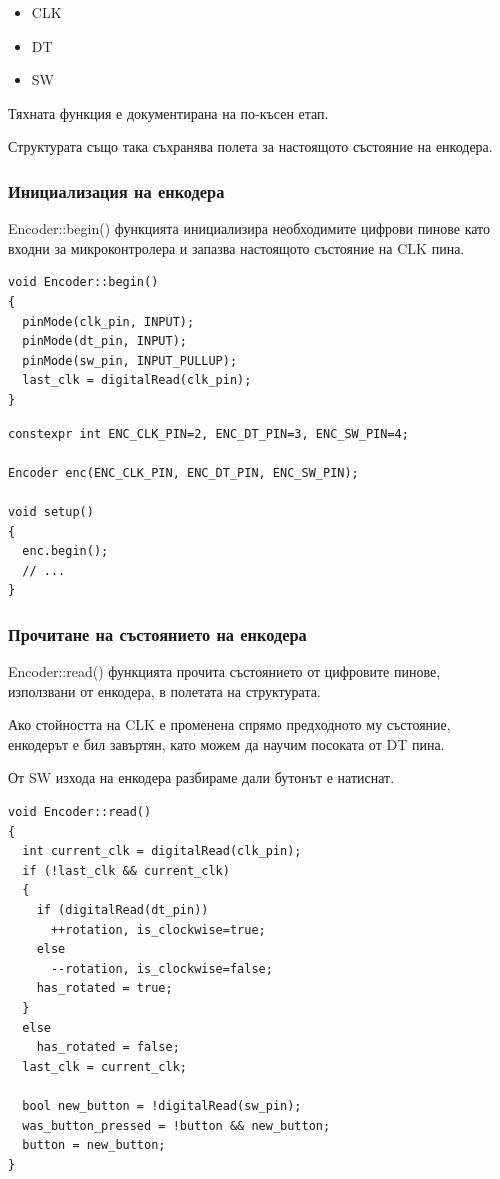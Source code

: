 \documentclass[titlepage, oneside, 14pt]{extbook}
\renewcommand{\texttt}[1]{{\small\ttfamily #1}}
\begin{document}
\begin{itemize}
    \item CLK
    \item DT
    \item SW
\end{itemize}

Тяхната функция е документирана на по-късен етап. %

Структурата също така съхранява полета за настоящото състояние на енкодера.


\subsubsection{Инициализация на енкодера}

\texttt{Encoder::begin()} функцията инициализира необходимите цифрови пинове като
входни за микроконтролера и запазва настоящото състояние на CLK пина.

\begin{verbatim}
void Encoder::begin()
{
  pinMode(clk_pin, INPUT);
  pinMode(dt_pin, INPUT);
  pinMode(sw_pin, INPUT_PULLUP);
  last_clk = digitalRead(clk_pin); 
}
\end{verbatim}

\begin{verbatim}
constexpr int ENC_CLK_PIN=2, ENC_DT_PIN=3, ENC_SW_PIN=4;

Encoder enc(ENC_CLK_PIN, ENC_DT_PIN, ENC_SW_PIN);

void setup()
{
  enc.begin();
  // ...
}
\end{verbatim}

\subsubsection{Прочитане на състоянието на енкодера}

\texttt{Encoder::read()} функцията прочита състоянието от цифровите пинове, използвани от енкодера, в полетата на структурата.

Ако стойността на CLK е променена спрямо предходното му състояние, енкодерът е бил завъртян, като можем да научим
посоката от DT пина.

От SW изхода на енкодера разбираме дали бутонът е натиснат.

\begin{verbatim}
void Encoder::read()
{
  int current_clk = digitalRead(clk_pin);
  if (!last_clk && current_clk)
  {
    if (digitalRead(dt_pin))
      ++rotation, is_clockwise=true;
    else
      --rotation, is_clockwise=false;
    has_rotated = true;
  }
  else
    has_rotated = false;
  last_clk = current_clk;

  bool new_button = !digitalRead(sw_pin);
  was_button_pressed = !button && new_button;
  button = new_button;
}
\end{verbatim}
\end{document}
